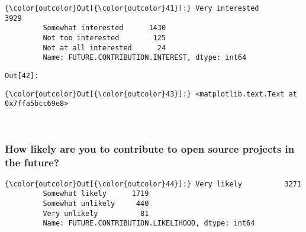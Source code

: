 \documentclass[11pt]{article}
\begin{document}
            \begin{Verbatim}[commandchars=\\\{\}]
{\color{outcolor}Out[{\color{outcolor}41}]:} Very interested          3929
         Somewhat interested      1430
         Not too interested        125
         Not at all interested      24
         Name: FUTURE.CONTRIBUTION.INTEREST, dtype: int64
\end{Verbatim}
        
\texttt{\color{outcolor}Out[{\color{outcolor}42}]:}
    

    


            \begin{Verbatim}[commandchars=\\\{\}]
{\color{outcolor}Out[{\color{outcolor}43}]:} <matplotlib.text.Text at 0x7ffa5bcc69e8>
\end{Verbatim}
        
    \begin{center}
    \end{center}
    { \hspace*{\fill} \\}
    
    \subsubsection{How likely are you to contribute to open source projects
in the
future?}\label{how-likely-are-you-to-contribute-to-open-source-projects-in-the-future}


            \begin{Verbatim}[commandchars=\\\{\}]
{\color{outcolor}Out[{\color{outcolor}44}]:} Very likely          3271
         Somewhat likely      1719
         Somewhat unlikely     440
         Very unlikely          81
         Name: FUTURE.CONTRIBUTION.LIKELIHOOD, dtype: int64
\end{Verbatim}
        
\end{document}
